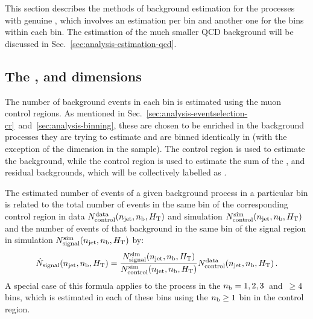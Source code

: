 This section describes the methods of background estimation for the processes 
with genuine \met, which involves an estimation per \njnbht bin and another one 
for the \mht bins within each \njnbht bin. The estimation of the much smaller 
QCD background will be discussed in Sec.~\ref{sec:analysis-estimation-qcd}.

\subsection{The \njet, \nb and \scalht dimensions}
\label{sec:analysis-estimation-njnbht}
The number of background events in each \njnbht bin is estimated using the muon 
control regions. As mentioned in 
Sec.~\ref{sec:analysis-eventselection-cr}~and~\ref{sec:analysis-binning}, these 
are chosen to be enriched in the background processes they are trying to 
estimate and are binned identically in \njnbht (with the exception of the \nb 
dimension in the \mmj sample). The \mmj control region is used to estimate the 
\znnj background, while the \mj control region is used to estimate the sum of 
the \wlj, \ttbar and residual backgrounds, which will be collectively labelled 
as \ttw.

The estimated number of events of a given background process in a particular 
\njnbht bin is related to the total number of events in the same bin of the 
corresponding control region in data $N_\mathrm{control}^\mathrm{data}(n_{\text{jet}}, n_{\text{b}}, \mbox{$H_\text{T}$})$ 
and simulation $N_\mathrm{control}^\mathrm{sim}(n_{\text{jet}}, n_{\text{b}}, \mbox{$H_\text{T}$})$ and the number of 
events of that background in the same bin of the signal region in simulation 
$N_\mathrm{signal}^\mathrm{sim}(n_{\text{jet}}, n_{\text{b}}, \mbox{$H_\text{T}$})$ by:
\begin{equation}
\label{eqn:estimation}
\hat{N}_\mathrm{signal}(n_{\text{jet}}, n_{\text{b}}, \mbox{$H_\text{T}$}) = 
\frac{N_\mathrm{signal}^\mathrm{sim}(n_{\text{jet}}, n_{\text{b}}, \mbox{$H_\text{T}$})}{N_\mathrm{control}^\mathrm{sim}(n_{\text{jet}}, n_{\text{b}}, \mbox{$H_\text{T}$})}
 N_\mathrm{control}^\mathrm{data}(n_{\text{jet}}, n_{\text{b}}, \mbox{$H_\text{T}$}) \, .
\end{equation}
A special case of this formula applies to the \znnj process in the $n_{\text{b}}=1, 2, 
3$~and~$\ge4$ bins, which is estimated in each of these bins using the $n_{\text{b}} \ge 
1$ bin in the \mmj control region.

